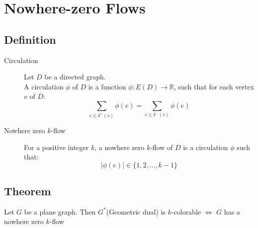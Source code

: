 \chapter{Nowhere-zero Flows}
    \section{Definition}
        \begin{description}
            \item[Circulation] Let $D$ be a directed graph.\\
                A circulation $\phi$ of $D$ is a function $\phi:E(D)\rightarrow \mathbb{R}$, such that for each vertex $v$ of $D$:
                \[
                    \sum_{e\in\delta^+(v)}\phi(e)=\sum_{e\in\delta^-(v)}\phi(e)
                \]
            \item[Nowhere zero $k$-flow] For a positive integer $k$, a nowhere zero $k$-flow of $D$ is a circulation $\phi$ such that:
                \[
                    |\phi(e)|\in \{1, 2, \ldots, k-1\}
                \]
        \end{description}
    \section{Theorem}
        Let $G$ be a plane graph. Then $G^*$(Geometric dual) is $k$-colorable $\Leftrightarrow$ $G$ has a nowhere zero $k$-flow\\
